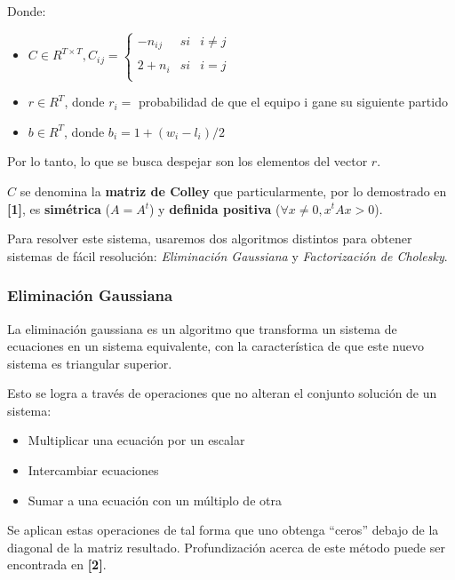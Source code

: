Donde:

\begin{itemize}
\item 
$C \in R^{T \times T}, C{_i}{_j} =
\left\{
	\begin{array}{lcc}
		-n{_i}{_j} & si & i \neq j \\
		\\ 2 + n{_i} & si & i = j \\
	\end{array}
\right.$
\item $r \in R^{T}$, donde $r{_i} = $ probabilidad de que el equipo i gane su siguiente partido
\item $b \in R^{T}$, donde $b{_i} = 1 + (w{_i} - l{_i}) / 2$
\end{itemize}

Por lo tanto, lo que se busca despejar son los elementos del vector $r$.

$C$ se denomina la \textbf{matriz de Colley} que particularmente, por lo demostrado en \textbf{[1]}, es \textbf{sim\'etrica} ($A = A{^t}$) y \textbf{definida positiva} ($\forall x \neq 0, x^{t}Ax > 0$).

Para resolver este sistema, usaremos dos algoritmos distintos para obtener sistemas de f\'acil resoluci\'on: \textit{Eliminaci\'on Gaussiana} y \textit{Factorizaci\'on de Cholesky}.

\subsubsection{Eliminaci\'on Gaussiana}

La eliminaci\'on gaussiana es un algoritmo que transforma un sistema de ecuaciones en un sistema equivalente, con la caracter\'istica de que este nuevo sistema es triangular superior.

Esto se logra a través de operaciones que no alteran el conjunto solución de un sistema:

\begin{itemize}
\item Multiplicar una ecuación por un escalar
\item Intercambiar ecuaciones
\item Sumar a una ecuación con un múltiplo de otra
\end{itemize}

Se aplican estas operaciones de tal forma que uno obtenga ``ceros'' debajo de la diagonal de la matriz resultado. Profundizaci\'on acerca de este m\'etodo puede ser encontrada en \textbf{[2]}.

